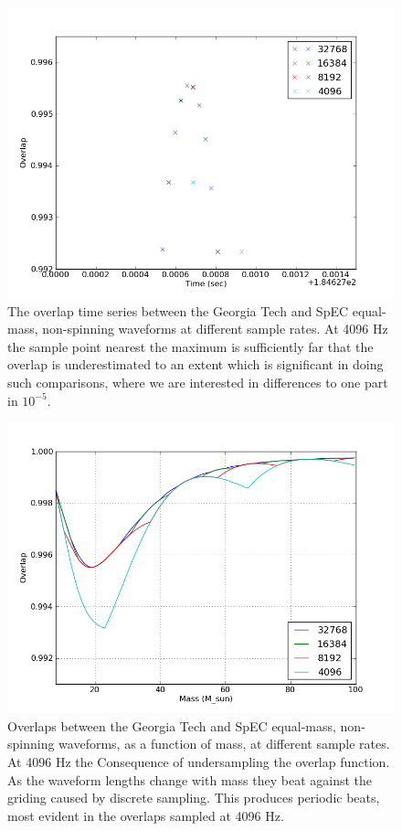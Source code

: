 \begin{figure}
  \includegraphics[width=\linewidth]{figures/ninja2/overlap_time_series}
  \caption[Sensitivity of the overlaps to sample rate]{
  \label{f:overlap_sample_frequency}
The overlap time series between the Georgia Tech and SpEC equal-mass,
non-spinning waveforms at different sample rates.  At 4096 Hz the
sample point nearest the maximum is sufficiently far that the overlap
is underestimated to an extent which is significant in doing such
comparisons, where we are interested in differences to one part in
$10^{-5}$.
}
\end{figure}%


\begin{figure}
  \includegraphics[width=\linewidth]{figures/ninja2/resolutions}
  \caption[Consequence of undersampling the overlap function]{
  \label{f:overlap_wiggles}
Overlaps between the Georgia Tech and SpEC equal-mass, non-spinning
waveforms, as a function of mass, at different sample rates.  At 4096
Hz the Consequence of undersampling the overlap function.  As the
waveform lengths change with mass they beat against the griding caused
by discrete sampling.  This produces periodic beats, most evident in
the overlaps sampled at 4096 Hz.}
\end{figure}%

